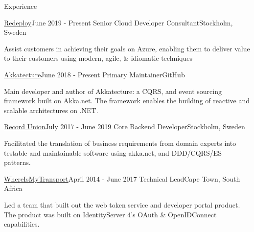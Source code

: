 \documentclass{resume} %
\begin{document}
    \begin{rSection}{Experience}

        \begin{rSubsection}
            {\href{https://redeploy.com}{Redeploy}}{June 2019 - Present}
            {Senior Cloud Developer Consultant}{Stockholm, Sweden}
            
            \item Assist customers in achieving their goals on Azure, enabling them to deliver
                value to their customers using modern, agile, \& idiomatic techniques
                
        \end{rSubsection}

        \begin{rSubsection}
            {\href{https://akkatecture.net}{Akkatecture}}{June 2018 - Present}
            {Primary Maintainer}{GitHub}
            
            \item Main developer and author of Akkatecture: a CQRS, and event sourcing
                framework built on Akka.net. The framework enables the
                building of reactive and scalable architectures on .NET.
                
        \end{rSubsection}

        \begin{rSubsection}
            {\href{https://recordunion.com}{Record Union}}{July 2017 - June 2019}
            {Core Backend Developer}{Stockholm, Sweden}
            
            \item Facilitated the translation of business requirements from domain
                experts into testable and maintainable software using akka.net,
                and DDD/CQRS/ES patterns.
                
        \end{rSubsection}

        \begin{rSubsection}
            {\href{https://www.whereismytransport.com/}{WhereIsMyTransport}}{April 2014 - June 2017}
            {Technical Lead}{Cape Town, South Africa}
            
            \item Led a team that built out the web token service and developer portal product.
                The product was built on IdentityServer 4's OAuth \& OpenIDConnect capabilities.
            

\end{rSubsection}
\end{rSection}
\end{document}
